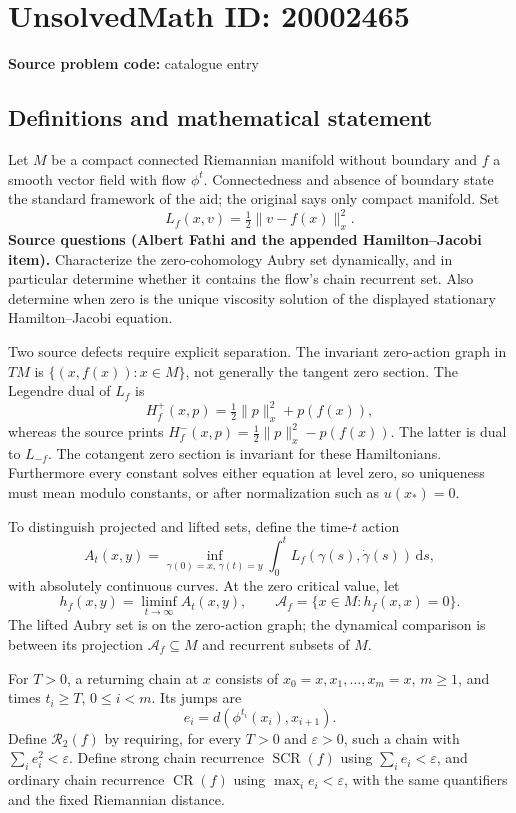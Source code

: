 \documentclass[11pt]{article}
\begin{document}
\section*{UnsolvedMath ID: 20002465}
\textbf{Source problem code:} catalogue entry
\subsection{Definitions and mathematical statement}
Let \(M\) be a compact connected Riemannian manifold without boundary and \(f\) a smooth vector field with flow \(\phi^t\). Connectedness and absence of boundary state the standard framework of the aid; the original says only compact manifold. Set
\[
 L_f(x,v)=\tfrac12\|v-f(x)\|_x^2.
\]
\textbf{Source questions (Albert Fathi and the appended Hamilton--Jacobi item).} Characterize the zero-cohomology Aubry set dynamically, and in particular determine whether it contains the flow's chain recurrent set. Also determine when zero is the unique viscosity solution of the displayed stationary Hamilton--Jacobi equation.

Two source defects require explicit separation. The invariant zero-action graph in \(TM\) is \(\{(x,f(x)):x\in M\}\), not generally the tangent zero section. The Legendre dual of \(L_f\) is
\[
 H_f^+(x,p)=\tfrac12\|p\|_x^2+p(f(x)),
\]
whereas the source prints \(H_f^-(x,p)=\tfrac12\|p\|_x^2-p(f(x))\). The latter is dual to \(L_{-f}\). The cotangent zero section is invariant for these Hamiltonians. Furthermore every constant solves either equation at level zero, so uniqueness must mean modulo constants, or after normalization such as \(u(x_*)=0\).

To distinguish projected and lifted sets, define the time-\(t\) action
\[
 A_t(x,y)=\inf_{\gamma(0)=x,\,\gamma(t)=y}
 \int_0^t L_f(\gamma(s),\dot\gamma(s))\,\mathrm ds,
\]
with absolutely continuous curves. At the zero critical value, let
\[
 h_f(x,y)=\liminf_{t\to\infty}A_t(x,y),\qquad
 \mathcal A_f=\{x\in M:h_f(x,x)=0\}.
\]
The lifted Aubry set is on the zero-action graph; the dynamical comparison is between its projection \(\mathcal A_f\subseteq M\) and recurrent subsets of \(M\).

For \(T>0\), a returning chain at \(x\) consists of \(x_0=x,x_1,\ldots,x_m=x\), \(m\geq1\), and times \(t_i\geq T\), \(0\leq i<m\). Its jumps are
\[
 e_i=d(\phi^{t_i}(x_i),x_{i+1}).
\]
Define \(\mathcal R_2(f)\) by requiring, for every \(T>0\) and \(\varepsilon>0\), such a chain with \(\sum_i e_i^2<\varepsilon\). Define strong chain recurrence \(\operatorname{SCR}(f)\) using \(\sum_i e_i<\varepsilon\), and ordinary chain recurrence \(\operatorname{CR}(f)\) using \(\max_i e_i<\varepsilon\), with the same quantifiers and the fixed Riemannian distance.
\end{document}
